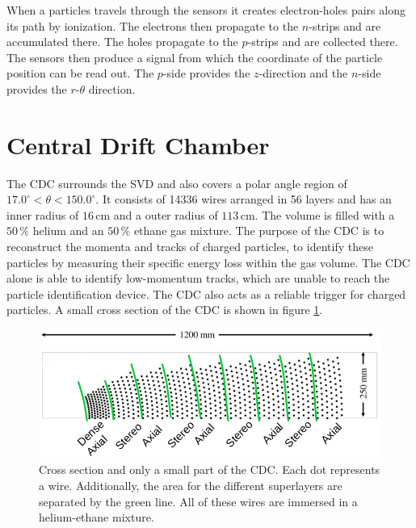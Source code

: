 \documentclass[a4paper,11pt,twosided,final,german,openbib,pdftex,listof=totoc,bibliography=totoc]{scrbook}
\begin{document}
When a particles travels through the sensors it creates electron-holes pairs along its path by ionization. The electrons then propagate to the $n$-strips and are accumulated there. The holes propagate to the $p$-strips and are collected there. The sensors then produce a signal from which the coordinate of the particle position can be read out. The $p$-side provides the $z$-direction and the $n$-side provides the $r$-$\theta$ direction.\cite{B2TR} \cite{bergauer2010silicon}



\section{Central Drift Chamber}
\label{sec:CDC}

The CDC surrounds the SVD and also covers a polar angle region of $17.0^{\circ} < \theta < 150.0^{\circ}$. It consists of 14336 wires arranged in 56 layers and has an inner radius of $16\,\textrm{cm}$ and a outer radius of $113\,\textrm{cm}$. The volume is filled with a $50\,\%$ helium and an $50\,\%$ ethane gas mixture. The purpose of the CDC is to reconstruct the momenta and tracks of charged particles, to identify these particles by measuring their specific energy loss within the gas volume. The CDC alone is able to identify low-momentum tracks, which are unable to reach the particle identification device. The CDC also acts as a reliable trigger for charged particles.\cite{B2TR} A small cross section of the CDC is shown in figure \ref{fig:CDC}.

\begin{figure}[h!] 
	\centering
	\includegraphics[width=\textwidth]{Bilder/CDC}
	\caption[Central Drift Chamber]{Cross section and only a small part of the CDC. Each dot represents a wire. Additionally, the area for the different superlayers are separated by the green line. All of these wires are immersed in a helium-ethane mixture.\cite{CDCHauth}}
	\label{fig:CDC}
\end{figure}
\end{document}
